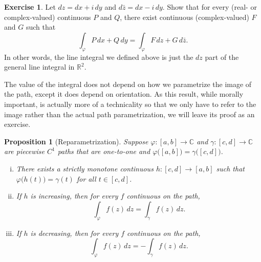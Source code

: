 \documentclass[12pt,openany]{book}
\newcommand{\C}{{\mathbb{C}}}
\newcommand{\R}{{\mathbb{R}}}
\theoremstyle{plain}
\newtheorem{prop}[thm]{Proposition}
\theoremstyle{remark}
\theoremstyle{definition}
\newenvironment{exbox}{%
    \def\FrameCommand{\vrule width 1pt \relax\hspace {10pt}}%
    \MakeFramed {\advance \hsize -\width \FrameRestore }%
}{%
    \endMakeFramed
}
\theoremstyle{exercise}
\newtheorem{exercise}{Exercise}[section]
\theoremstyle{example}
\begin{document}
\begin{exbox}
\begin{exercise}
Let $dz = dx + i \, dy$ and 
$d\bar{z} = dx - i \, dy$.  Show that for every (real- or complex-valued) continuous $P$ and $Q$,
there exist continuous (complex-valued) $F$ and $G$ such that
\begin{equation*}
\int_{\varphi} P \, dx + Q \, dy
=
\int_{\varphi} F \, dz + G \, d\bar{z} .
\end{equation*}
In other words, the line integral we defined above is just the $dz$ part of
the general line integral in $\R^2$.
\end{exercise}
\end{exbox}

The value of the integral does not depend on how we parametrize the image of
the path, except it does depend on orientation.  As this result, while
morally important, is actually more of a technicality so that we only have
to refer to the image rather than the actual path parametrization, we will
leave its proof as an exercise.

\begin{prop}[Reparametrization]
Suppose $\varphi \colon [a,b] \to \C$ and $\gamma \colon [c,d] \to \C$ are
piecewise $C^1$ paths that are one-to-one and
$\varphi\bigl([a,b]\bigr) = \gamma\bigl([c,d]\bigr)$.
\begin{enumerate}[(i)]
\item
There exists a strictly monotone continuous $h \colon [c,d] \to [a,b]$ such
that $\varphi\bigl(h(t)\bigr) = \gamma(t)$ for all $t \in [c,d]$.
\item
If $h$ is increasing, then for every $f$ continuous on the path,
\begin{equation*}
\int_\varphi f(z) \, dz = \int_{\gamma} f(z) \, dz .
\end{equation*}
\item
If $h$ is decreasing, then for every $f$ continuous on the path,
\begin{equation*}
\int_\varphi f(z) \, dz = - \int_{\gamma} f(z) \, dz .
\end{equation*}
\end{enumerate}
\end{prop}
\end{document}
